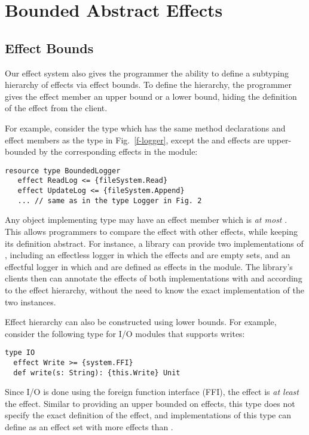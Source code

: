\chapter{Bounded Abstract Effects}


\section{Effect Bounds}
\label{sec-bound}

Our effect system also gives the programmer the ability to define a subtyping hierarchy of effects via effect bounds. To define the hierarchy, the programmer gives the effect member an upper bound or a lower bound, hiding the definition of the effect from the client.

For example, consider the type  which has the same method declarations and effect members as the type  in Fig.~\ref{f-logger}, except the  and  effects are upper-bounded by the corresponding effects in the  module:

\begin{minipage}{\linewidth}
\begin{lstlisting}[xleftmargin=-5pt, numbers=none]
resource type BoundedLogger
   effect ReadLog <= {fileSystem.Read}
   effect UpdateLog <= {fileSystem.Append}
   ... // same as in the type Logger in Fig. 2
\end{lstlisting}
\end{minipage}
Any object implementing type  may have an effect member  which is \textit{at most} . This allows programmers to compare the  effect with other effects, while keeping its definition abstract. For instance, a library can provide two implementations of , including an effectless logger in which the effects  and  are empty sets, and an effectful logger in which  and  are defined as effects in the  module. The library's clients then can annotate the effects of both implementations with  and  according to the effect hierarchy, without the need to know the exact implementation of the two instances.

Effect hierarchy can also be constructed using lower bounds. For example, consider the following type for I/O modules that supports writes:

\begin{minipage}{\linewidth}
\begin{lstlisting}[xleftmargin=-5pt, numbers=none]
type IO
  effect Write >= {system.FFI}
  def write(s: String): {this.Write} Unit
\end{lstlisting}
\end{minipage}
Since I/O is done using the foreign function interface (FFI), the  effect is \textit{at least} the  effect. Similar to providing an upper bounded on effects, this type does not specify the exact definition of the  effect, and implementations of this type can define  as an effect set with more effects than .

